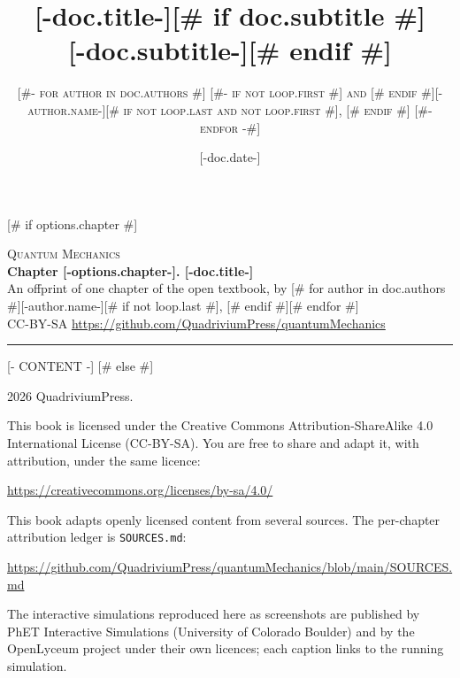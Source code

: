 \documentclass[letterpaper,11pt]{article}
[# else #]
\title{\Huge \textbf{[-doc.title-]}[# if doc.subtitle #] \\[0.5em] \huge [-doc.subtitle-][# endif #]}
\author{\textsc{
[#- for author in doc.authors #]
  [#- if not loop.first #] and [# endif #][-author.name-][# if not loop.last and not loop.first #], [# endif #]
[#- endfor -#]
}}
[# if doc.date #]\date{[-doc.date-]}[# endif #]
\begin{document}
\sloppy

[# if options.chapter #]
\thispagestyle{plain}
\begin{center}
  {\small\scshape\color{qmgray} Quantum Mechanics}\\[0.35em]
  {\LARGE\bfseries Chapter [-options.chapter-]. [-doc.title-]}\\[0.6em]
  {\small An offprint of one chapter of the open textbook, by
   [# for author in doc.authors #][-author.name-][# if not loop.last #], [# endif #][# endfor #]}\\[0.2em]
  {\small\color{qmgray} CC\--BY\--SA \textperiodcentered{}
   \url{https://github.com/QuadriviumPress/quantumMechanics}}
\end{center}
\vspace{1em}
\hrule
\vspace{1.5em}

[- CONTENT -]
[# else #]
\frontmatter
\hypersetup{pageanchor=false}
\maketitle

\thispagestyle{empty}
\null\vfill
\noindent\small
\textcopyright{} 2026 QuadriviumPress.\par\medskip
\noindent This book is licensed under the Creative Commons
Attribution\--ShareAlike 4.0 International License (CC\--BY\--SA). You
are free to share and adapt it, with attribution, under the same licence:
\par\smallskip
\noindent\url{https://creativecommons.org/licenses/by-sa/4.0/}\par\medskip
\noindent This book adapts openly licensed content from several sources. The
per-chapter attribution ledger is \texttt{SOURCES.md}:\par\smallskip
\noindent\url{https://github.com/QuadriviumPress/quantumMechanics/blob/main/SOURCES.md}
\par\medskip
\noindent The interactive simulations reproduced here as screenshots are
published by PhET Interactive Simulations (University of Colorado Boulder) and
by the OpenLyceum project under their own licences; each caption links to the
running simulation.
\par\vfill\normalsize
\end{document}
